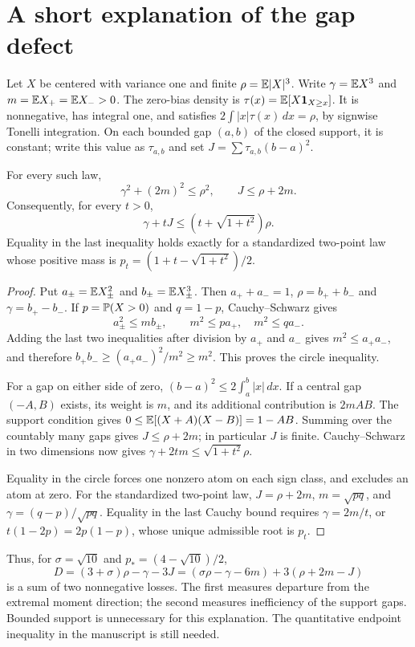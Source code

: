 \section{A short explanation of the gap defect}

Let $X$ be centered with variance one and finite $\rho=\mathbb E|X|^3$.
Write $\gamma=\mathbb E X^3$ and $m=\mathbb E X_+=\mathbb E X_->0$.
The zero-bias density is $\tau(x)=\mathbb E[X\mathbf1_{X\ge x}]$.
It is nonnegative, has integral one, and satisfies
$2\int |x|\tau(x)\,dx=\rho$, by signwise Tonelli integration.
On each bounded gap $(a,b)$ of the closed support, it is constant;
write this value as $\tau_{a,b}$ and set
$J=\sum\tau_{a,b}(b-a)^2$.

\begin{proposition}
For every such law,
\[
 \gamma^2+(2m)^2\le\rho^2,\qquad J\le\rho+2m.
\]
Consequently, for every $t>0$,
\[
 \gamma+tJ\le (t+\sqrt{1+t^2})\rho.
\]
Equality in the last inequality holds exactly for a standardized
two-point law whose positive mass is
$p_t=(1+t-\sqrt{1+t^2})/2$.
\end{proposition}
\begin{proof}
Put $a_\pm=\mathbb E X_\pm^2$ and $b_\pm=\mathbb E X_\pm^3$.
Then $a_++a_-=1$, $\rho=b_++b_-$ and $\gamma=b_+-b_-$.
If $p=\mathbb P(X>0)$ and $q=1-p$, Cauchy--Schwarz gives
\[
 a_\pm^2\le mb_\pm,\qquad m^2\le pa_+,\quad m^2\le qa_-.
\]
Adding the last two inequalities after division by $a_+$ and $a_-$
gives $m^2\le a_+a_-$, and therefore
$b_+b_-\ge(a_+a_-)^2/m^2\ge m^2$.
This proves the circle inequality.

For a gap on either side of zero,
$(b-a)^2\le2\int_a^b|x|\,dx$.
If a central gap $(-A,B)$ exists, its weight is $m$, and its additional
contribution is $2mAB$. The support condition gives
$0\le\mathbb E[(X+A)(X-B)]=1-AB$.
Summing over the countably many gaps gives $J\le\rho+2m$;
in particular $J$ is finite. Cauchy--Schwarz in two dimensions now gives
$\gamma+2tm\le\sqrt{1+t^2}\rho$.

Equality in the circle forces one nonzero atom on each sign class,
and excludes an atom at zero. For the standardized two-point law,
$J=\rho+2m$, $m=\sqrt{pq}$, and
$\gamma=(q-p)/\sqrt{pq}$. Equality in the last Cauchy bound requires
$\gamma=2m/t$, or $t(1-2p)=2p(1-p)$, whose unique admissible root
is $p_t$.
\end{proof}

Thus, for $\sigma=\sqrt{10}$ and $p_*=(4-\sqrt{10})/2$,
\[
 D=(3+\sigma)\rho-\gamma-3J
   =(\sigma\rho-\gamma-6m)+3(\rho+2m-J)
\]
is a sum of two nonnegative losses. The first measures departure from
the extremal moment direction; the second measures inefficiency of the
support gaps. Bounded support is unnecessary for this explanation.
The quantitative endpoint inequality in the manuscript is still needed.

